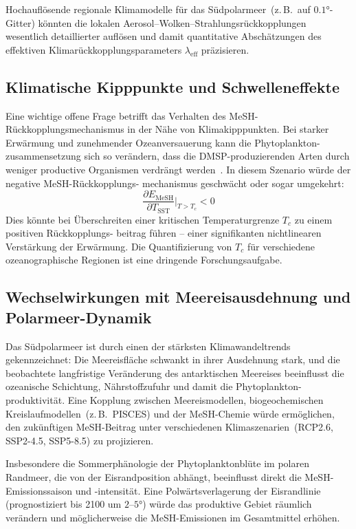 ﻿\documentclass[a4paper,12pt]{article}
\theoremstyle{definition}
\begin{document}
Hochauflösende regionale Klimamodelle für das Südpolarmeer~(z.\,B.\ auf $0.1 °$-Gitter) könnten
die lokalen Aerosol--Wolken--Strahlungsrückkopplungen wesentlich detaillierter auflösen und
damit quantitative Abschätzungen des effektiven Klimarückkopplungsparameters $\lambda_{\mathrm{eff}}$
präzisieren.

\subsection{Klimatische Kipppunkte und Schwelleneffekte}

Eine wichtige offene Frage betrifft das Verhalten des MeSH-Rückkopplungsmechanismus in der Nähe
von Klimakipppunkten. Bei starker Erwärmung und zunehmender Ozeanversauerung kann die Phytoplankton-
zusammensetzung sich so verändern, dass die DMSP-produzierenden Arten durch weniger productive
Organismen verdrängt werden~\cite{bopp2001}. In diesem Szenario würde der negative MeSH-Rückkopplungs-
mechanismus geschwächt oder sogar umgekehrt:
\[
  \frac{\partial E_{\mathrm{MeSH}}}{\partial T_{\mathrm{SST}}}\bigg|_{T > T_c} < 0
\]
Dies könnte bei Überschreiten einer kritischen Temperaturgrenze $T_c$ zu einem positiven Rückkopplungs-
beitrag führen -- einer signifikanten nichtlinearen Verstärkung der Erwärmung. Die Quantifizierung
von $T_c$ für verschiedene ozeanographische Regionen ist eine dringende Forschungsaufgabe.

\subsection{Wechselwirkungen mit Meereisausdehnung und Polarmeer-Dynamik}

Das Südpolarmeer ist durch einen der stärksten Klimawandeltrends gekennzeichnet: Die Meereisfläche
schwankt in ihrer Ausdehnung stark, und die beobachtete langfristige Veränderung des antarktischen
Meereises beeinflusst die ozeanische Schichtung, Nährstoffzufuhr und damit die Phytoplankton-
produktivität. Eine Kopplung zwischen Meereismodellen, biogeochemischen Kreislaufmodellen~(z.\,B.\ PISCES)
und der MeSH-Chemie würde ermöglichen, den zukünftigen MeSH-Beitrag unter verschiedenen
Klimaszenarien~(RCP2.6, SSP2-4.5, SSP5-8.5) zu projizieren.

Insbesondere die Sommerphänologie der Phytoplanktonblüte im polaren Randmeer, die von der
Eisrandposition abhängt, beeinflusst direkt die MeSH-Emissionssaison und -intensität. Eine
Polwärtsverlagerung der Eisrandlinie (prognostiziert bis 2100 um $2$--$5 °$) würde das produktive
Gebiet räumlich verändern und möglicherweise die MeSH-Emissionen im Gesamtmittel erhöhen.
\end{document}
